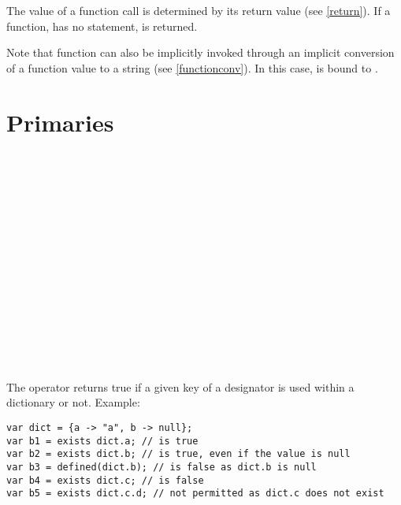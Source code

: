 \noindent
The value of a function call is determined by its return value
(see \ref{return}). If a function, has no 
statement,  is returned.

Note that function can also be implicitly invoked through an implicit
conversion of a function value to a string (see \ref{functionconv}).
In this case,  is bound to .

\section{Primaries}

\begin{grammar}
      \produces {} \\
      \produces {}  \\
      \produces {}
         \lextoken{(}  \lextoken{)} \\
      \produces {} \\
      \produces {} \\
      \produces {} \\
      \produces {} \\
      \produces \lextoken{(}  \lextoken{)} \\
      \produces {} \\
      \produces {} \\
      \produces {} \\
      \produces {} \\
      \produces {} \\
      \produces {} \\
      \produces {}
\end{grammar}

\noindent
The  operator returns true if a given key of a designator
is used within a dictionary or not. Example:

\begin{lstlisting}
var dict = {a -> "a", b -> null};
var b1 = exists dict.a; // is true
var b2 = exists dict.b; // is true, even if the value is null
var b3 = defined(dict.b); // is false as dict.b is null
var b4 = exists dict.c; // is false
var b5 = exists dict.c.d; // not permitted as dict.c does not exist
\end{lstlisting}

